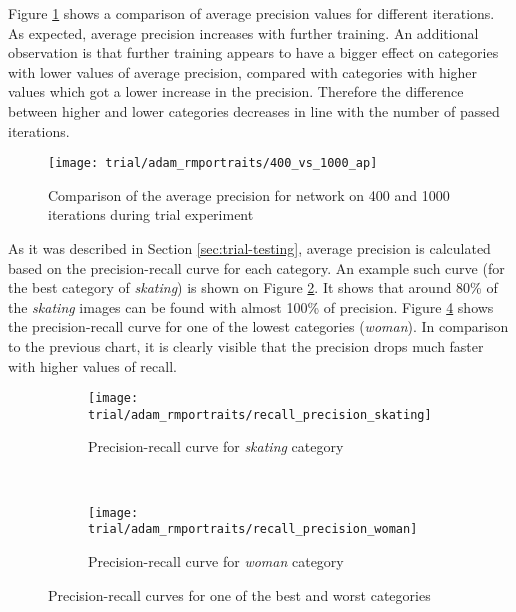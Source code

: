     Figure \ref{fig:trial-400-vs-1000} shows a comparison of average precision values for different iterations. As expected, average precision increases with further training. An additional observation is that further training appears to have a bigger effect on categories with lower values of average precision, compared with categories with higher values which got a lower increase in the precision. Therefore the difference between higher and lower categories decreases in line with the number of passed iterations.
    
    \begin{figure}[H]
        \centering
        \texttt{[image: trial/adam\_rmportraits/400\_vs\_1000\_ap]}
        \caption{Comparison of the average precision for network on 400 and 1000 iterations during trial experiment}
        \label{fig:trial-400-vs-1000}
    \end{figure}
    
    As it was described in Section \ref{sec:trial-testing}, average precision is calculated based on the precision-recall curve for each category. An example such curve (for the best category of \textit{skating}) is shown on Figure \ref{fig:trial-precision-recall-skating}. It shows that around 80\% of the \textit{skating} images can be found with almost 100\% of precision. Figure \ref{fig:trial-precision-recall-woman} shows the precision-recall curve for one of the lowest categories (\textit{woman}). In comparison to the previous chart, it is clearly visible that the precision drops much faster with higher values of recall.
    
    \begin{figure}[H]
    \centering
    \begin{subfigure}[a]{0.9\textwidth}
        \texttt{[image: trial/adam\_rmportraits/recall\_precision\_skating]}
        \caption{Precision-recall curve for \textit{skating} category}
        \label{fig:trial-precision-recall-skating}
    \end{subfigure}
    \\
    \begin{subfigure}[a]{0.9\textwidth}
        \texttt{[image: trial/adam\_rmportraits/recall\_precision\_woman]}
        \caption{Precision-recall curve for \textit{woman} category}
        \label{fig:trial-precision-recall-woman}
    \end{subfigure}
    \caption{Precision-recall curves for one of the best and worst categories}
    \end{figure}
    

